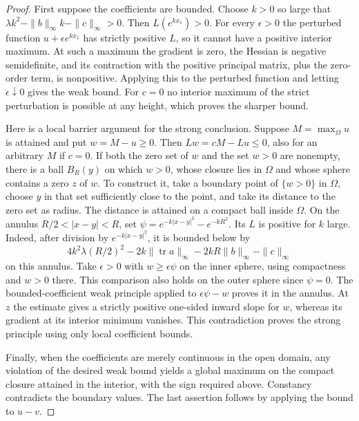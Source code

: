 \documentclass[11pt,oneside,openany]{book}
\theoremstyle{plain}
\theoremstyle{definition}
\theoremstyle{remark}
\begin{document}
\begin{proof}
First suppose the coefficients are bounded. Choose \(k>0\) so large
that \(\lambda k^2-\|b\|_\infty k-\|c\|_\infty>0\).
Then \(L(e^{kx_1})>0\). For every \(\epsilon>0\) the perturbed
function \(u+\epsilon e^{kx_1}\) has strictly positive \(L\), so it
cannot have a positive interior maximum. At such a maximum the
gradient is zero, the Hessian is negative semidefinite, and its
contraction with the positive principal matrix, plus the zero-order
term, is nonpositive. Applying this to the perturbed function and
letting \(\epsilon\downarrow0\) gives the weak bound. For \(c=0\)
no interior maximum of the strict perturbation is possible at any
height, which proves the sharper bound.

Here is a local barrier argument for the strong conclusion. Suppose
\(M=\max_\Omega u\) is attained and put \(w=M-u\geq0\).
Then \(Lw=cM-Lu\leq0\), also for an arbitrary \(M\) if \(c=0\).
If both the zero set of \(w\) and the set \(w>0\) are nonempty,
there is a ball \(B_R(y)\) on which \(w>0\), whose closure lies in
\(\Omega\) and whose sphere contains a zero \(z\) of \(w\).
To construct it, take a boundary point of \(\{w>0\}\) in
\(\Omega\), choose \(y\) in that set sufficiently close to the
point, and take its distance to the zero set as radius. The
distance is attained on a compact ball inside \(\Omega\).
On the annulus \(R/2<|x-y|<R\), set
\(\psi=e^{-k|x-y|^2}-e^{-kR^2}\). Its \(L\) is positive for \(k\)
large. Indeed, after division by \(e^{-k|x-y|^2}\), it is bounded
below by
\[
 4k^2\lambda(R/2)^2-2k\|\operatorname{tr}a\|_\infty
 -2kR\|b\|_\infty-\|c\|_\infty
\]
on this annulus. Take \(\epsilon>0\) with \(w\geq\epsilon\psi\)
on the inner sphere, using compactness and \(w>0\) there.
This comparison also holds on the outer sphere since \(\psi=0\).
The bounded-coefficient weak principle applied to
\(\epsilon\psi-w\) proves it in the annulus. At \(z\) the estimate
gives a strictly positive one-sided inward slope for \(w\),
whereas its gradient at its interior minimum vanishes.
This contradiction proves the strong principle using only local
coefficient bounds.

Finally, when the coefficients are merely continuous in the open
domain, any violation of the desired weak bound yields a global
maximum on the compact closure attained in the interior, with the
sign required above. Constancy contradicts the boundary values.
The last assertion follows by applying the bound to \(u-v\).
\end{proof}
\end{document}
